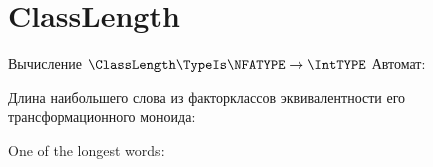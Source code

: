 \section{ClassLength}
\begin{frame}{Вычисление $\ClassLength\TypeIs\NFATYPE\to\IntTYPE$}
	Автомат:


	Длина наибольшего слова из факторклассов эквивалентности его трансформационного моноида:

	One of the longest words:


\end{frame}

